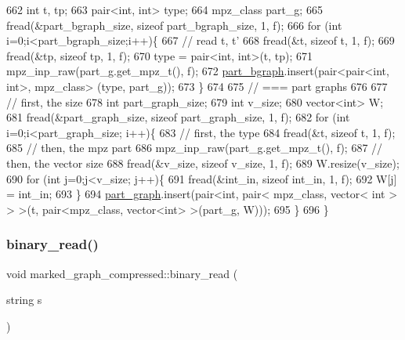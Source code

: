 \begin{DoxyCode}
662   \textcolor{keywordtype}{int} t, tp;
663   pair<int, int> type; 
664   mpz\_class part\_g; 
665   fread(&part\_bgraph\_size, \textcolor{keyword}{sizeof} part\_bgraph\_size, 1, f);
666   \textcolor{keywordflow}{for} (\textcolor{keywordtype}{int} i=0;i<part\_bgraph\_size;i++)\{
667     \textcolor{comment}{// read t, t'}
668     fread(&t, \textcolor{keyword}{sizeof} t, 1, f);
669     fread(&tp, \textcolor{keyword}{sizeof} tp, 1, f);
670     type = pair<int, int>(t, tp);
671     mpz\_inp\_raw(part\_g.get\_mpz\_t(), f);
672     \hyperlink{classmarked__graph__compressed_a7b3267063fba30b45eb21b3ba4e07536}{part\_bgraph}.insert(pair<pair<int, int>, mpz\_class> (type, part\_g));
673   \}
674 
675   \textcolor{comment}{// === part graphs}
676 
677   \textcolor{comment}{// first, the size}
678   \textcolor{keywordtype}{int} part\_graph\_size;
679   \textcolor{keywordtype}{int} v\_size;
680   vector<int> W; 
681   fread(&part\_graph\_size, \textcolor{keyword}{sizeof} part\_graph\_size, 1, f);
682   \textcolor{keywordflow}{for} (\textcolor{keywordtype}{int} i=0;i<part\_graph\_size; i++)\{
683     \textcolor{comment}{// first, the type}
684     fread(&t, \textcolor{keyword}{sizeof} t, 1, f);
685     \textcolor{comment}{// then, the mpz part}
686     mpz\_inp\_raw(part\_g.get\_mpz\_t(), f);
687     \textcolor{comment}{// then, the vector size}
688     fread(&v\_size, \textcolor{keyword}{sizeof} v\_size, 1, f);
689     W.resize(v\_size);
690     \textcolor{keywordflow}{for} (\textcolor{keywordtype}{int} j=0;j<v\_size; j++)\{
691       fread(&int\_in, \textcolor{keyword}{sizeof} int\_in, 1, f);
692       W[j] = int\_in;
693     \}
694     \hyperlink{classmarked__graph__compressed_ae179a4737e6eab905c18a94d44ef64b7}{part\_graph}.insert(pair<\textcolor{keywordtype}{int}, pair< mpz\_class, vector< int > > >(t, pair<mpz\_class, vector<int>
       >(part\_g, W)));
695   \}
696 \}
\end{DoxyCode}
\mbox{\label{classmarked__graph__compressed_a01c67fe4234738db6bb60459515c3ad8}} 
\subsubsection{\texorpdfstring{binary\+\_\+read()}{binary\_read()}\hspace{0.1cm}{\footnotesize\ttfamily [2/2]}}
{\footnotesize\ttfamily void marked\+\_\+graph\+\_\+compressed\+::binary\+\_\+read (\begin{DoxyParamCaption}\item[{string}]{s }\end{DoxyParamCaption})}

